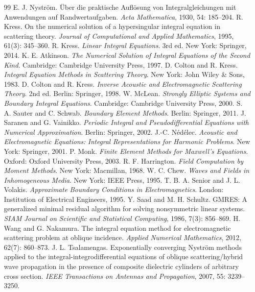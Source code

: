 \documentclass[11pt]{article}
\numberwithin{equation}{section}
\begin{document}
\begin{thebibliography}{99}
\setlength{\itemsep}{0.25em}
 E. J. Nystr\"om. \"{U}ber die praktische Aufl\"osung von Integralgleichungen mit Anwendungen auf Randwertaufgaben. \emph{Acta Mathematica}, 1930, 54: 185--204.
 R. Kress. On the numerical solution of a hypersingular integral equation in scattering theory. \emph{Journal of Computational and Applied Mathematics}, 1995, 61(3): 345--360.
 R. Kress. \emph{Linear Integral Equations}. 3rd ed. New York: Springer, 2014.
 K. E. Atkinson. \emph{The Numerical Solution of Integral Equations of the Second Kind}. Cambridge: Cambridge University Press, 1997.
 D. Colton and R. Kress. \emph{Integral Equation Methods in Scattering Theory}. New York: John Wiley \& Sons, 1983.
 D. Colton and R. Kress. \emph{Inverse Acoustic and Electromagnetic Scattering Theory}. 2nd ed. Berlin: Springer, 1998.
 W. McLean. \emph{Strongly Elliptic Systems and Boundary Integral Equations}. Cambridge: Cambridge University Press, 2000.
 S. A. Sauter and C. Schwab. \emph{Boundary Element Methods}. Berlin: Springer, 2011.
 J. Saranen and G. Vainikko. \emph{Periodic Integral and Pseudodifferential Equations with Numerical Approximation}. Berlin: Springer, 2002.
 J.-C. N\'ed\'elec. \emph{Acoustic and Electromagnetic Equations: Integral Representations for Harmonic Problems}. New York: Springer, 2001.
 P. Monk. \emph{Finite Element Methods for Maxwell's Equations}. Oxford: Oxford University Press, 2003.
 R. F. Harrington. \emph{Field Computation by Moment Methods}. New York: Macmillan, 1968.
 W. C. Chew. \emph{Waves and Fields in Inhomogeneous Media}. New York: IEEE Press, 1995.
 T. B. A. Senior and J. L. Volakis. \emph{Approximate Boundary Conditions in Electromagnetics}. London: Institution of Electrical Engineers, 1995.
 Y. Saad and M. H. Schultz. GMRES: A generalized minimal residual algorithm for solving nonsymmetric linear systems. \emph{SIAM Journal on Scientific and Statistical Computing}, 1986, 7(3): 856--869.
 H. Wang and G. Nakamura. The integral equation method for electromagnetic scattering problem at oblique incidence. \emph{Applied Numerical Mathematics}, 2012, 62(7): 860--873.
 J. L. Tsalamengas. Exponentially converging Nystr\"om methods applied to the integral-integrodifferential equations of oblique scattering/hybrid wave propagation in the presence of composite dielectric cylinders of arbitrary cross section. \emph{IEEE Transactions on Antennas and Propagation}, 2007, 55: 3239--3250.

\end{thebibliography}
\end{document}
